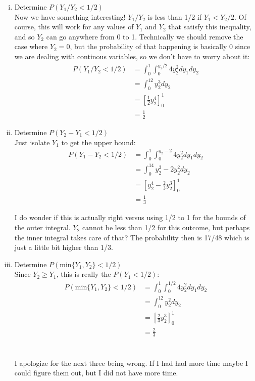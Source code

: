 \documentclass{scrartcl}
\begin{document}
\begin{enumerate}
\begin{enumerate}[i.]
      \item Determine $P(Y_1/Y_2<1/2)$\\

        Now we have something interesting! $Y_1/Y_2$ is less than 1/2 if $Y_1<Y_2/2$. Of course, this will work for any values of $Y_1$ and $Y_2$ that satisfy this inequality, and so $Y_2$ can go anywhere from 0 to 1. Technically we should remove the case where $Y_2=0$, but the probability of that happening is basically 0 since we are dealing with continous variables, so we don't have to worry about it:
        \begin{align*}
          P(Y_1/Y_2<1/2) &= \int_0^{1}\int_0^{y_2/2}4y_2^2dy_1dy_2\\
          &= \int_0^12y_2^3dy_2\\
          &= [\frac{1}{2}y_2^4]_0^1\\
          &= \frac{1}{2}
        \end{align*}
                
      \item Determine $P(Y_2-Y_1<1/2)$\\

        Just isolate $Y_1$ to get the upper bound:
        \begin{align*}
          P(Y_1-Y_2<1/2) &= \int_0^{1}\int_0^{y_2-2}4y_2^2dy_1dy_2\\
          &= \int_0^14y_2^3 - 2y_2^2dy_2\\
          &= [y_2^4-\frac{2}{3}y_2^3]_0^1\\
          &= \frac{1}{3}
        \end{align*}

        I do wonder if this is actually right versus using 1/2 to 1 for the bounds of the outer integral. $Y_2$ cannot be less than 1/2 for this outcome, but perhaps the inner integral takes care of that? The probability then is 17/48 which is just a little bit higher than 1/3.

      \item Determine $P(\text{min}\{Y_1,Y_2\}<1/2)$\\

        Since $Y_2\ge Y_1$, this is really the $P(Y_1<1/2)$:
        \begin{align*}
          P(\text{min}\{Y_1,Y_2\}<1/2) &= \int_0^{1}\int_0^{1/2}4y_2^2dy_1dy_2\\
          &= \int_0^12y_2^2dy_2\\
          &= [\frac{2}{3}y_2^3]_0^1\\
          &= \frac{2}{3}
        \end{align*}
\ \\\ \\
        I apologize for the next three being wrong. If I had had more time maybe I could figure them out, but I did not have more time.\\\ \\
        

\end{enumerate}
\end{enumerate}
\end{document}

